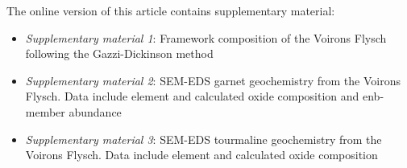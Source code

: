 \documentclass[twoside]{article}
\begin{document}
The online version of this article contains supplementary material:
\begin{itemize}
 \item \emph{Supplementary material 1}: Framework composition of the Voirons Flysch following the Gazzi-Dickinson method
 \item \emph{Supplementary material 2}: SEM-EDS garnet geochemistry from the Voirons Flysch. Data include element and calculated oxide composition and enb-member abundance
 \item \emph{Supplementary material 3}: SEM-EDS tourmaline geochemistry from the Voirons Flysch. Data include element and calculated oxide composition
\end{itemize}



\end{document}
